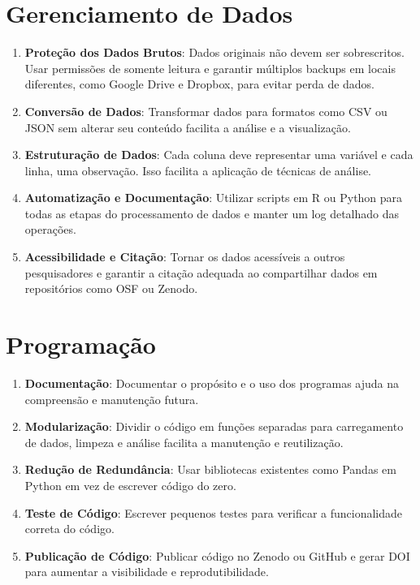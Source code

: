\documentclass[
  a4paper,
]{book}
\providecommand{\tightlist}{%
  \setlength{\itemsep}{0pt}\setlength{\parskip}{0pt}}\usepackage{longtable,booktabs,array}
\begin{document}
\section{Gerenciamento de Dados}\label{gerenciamento-de-dados}

\begin{enumerate}
\def\labelenumi{\arabic{enumi}.}
\tightlist
\item
  \textbf{Proteção dos Dados Brutos}: Dados originais não devem ser
  sobrescritos. Usar permissões de somente leitura e garantir múltiplos
  backups em locais diferentes, como Google Drive e Dropbox, para evitar
  perda de dados.
\item
  \textbf{Conversão de Dados}: Transformar dados para formatos como CSV
  ou JSON sem alterar seu conteúdo facilita a análise e a visualização.
\item
  \textbf{Estruturação de Dados}: Cada coluna deve representar uma
  variável e cada linha, uma observação. Isso facilita a aplicação de
  técnicas de análise.
\item
  \textbf{Automatização e Documentação}: Utilizar scripts em R ou Python
  para todas as etapas do processamento de dados e manter um log
  detalhado das operações.
\item
  \textbf{Acessibilidade e Citação}: Tornar os dados acessíveis a outros
  pesquisadores e garantir a citação adequada ao compartilhar dados em
  repositórios como OSF ou Zenodo.
\end{enumerate}

\section{Programação}\label{programauxe7uxe3o}

\begin{enumerate}
\def\labelenumi{\arabic{enumi}.}
\tightlist
\item
  \textbf{Documentação}: Documentar o propósito e o uso dos programas
  ajuda na compreensão e manutenção futura.
\item
  \textbf{Modularização}: Dividir o código em funções separadas para
  carregamento de dados, limpeza e análise facilita a manutenção e
  reutilização.
\item
  \textbf{Redução de Redundância}: Usar bibliotecas existentes como
  Pandas em Python em vez de escrever código do zero.
\item
  \textbf{Teste de Código}: Escrever pequenos testes para verificar a
  funcionalidade correta do código.
\item
  \textbf{Publicação de Código}: Publicar código no Zenodo ou GitHub e
  gerar DOI para aumentar a visibilidade e reprodutibilidade.
\end{enumerate}
\end{document}
